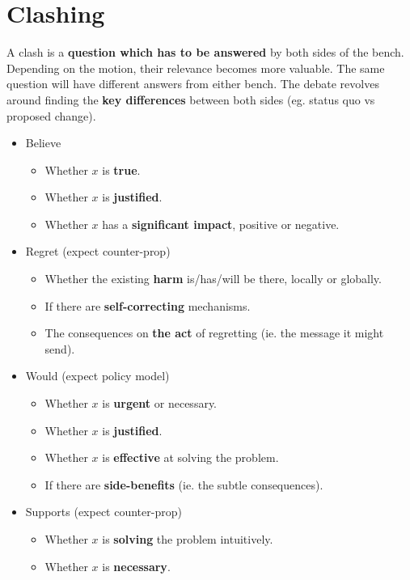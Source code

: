 

\section*{Clashing}

A clash is a \textbf{question which has to be answered} by both sides of the bench. Depending on the motion, their relevance becomes more valuable. The same question will have different answers from either bench. The debate revolves around finding the \textbf{key differences} between both sides (eg. status quo vs proposed change).

\begin{itemize}
	\item Believe
	\begin{itemize}
		\item Whether $x$ is \textbf{true}.
		\item Whether $x$ is \textbf{justified}.
		\item Whether $x$ has a \textbf{significant impact}, positive or negative.
	\end{itemize}
	\item Regret (expect counter-prop)
	\begin{itemize}
		\item Whether the existing \textbf{harm} is/has/will be there, locally or globally.
		\item If there are \textbf{self-correcting} mechanisms.
		\item The consequences on \textbf{the act} of regretting (ie. the message it might send).
	\end{itemize}
	\item Would (expect policy model)
	\begin{itemize}
		\item Whether $x$ is \textbf{urgent} or necessary.
		\item Whether $x$ is \textbf{justified}.
		\item Whether $x$ is \textbf{effective} at solving the problem.
		\item If there are \textbf{side-benefits} (ie. the subtle consequences).
	\end{itemize}
	\item Supports (expect counter-prop)
	\begin{itemize}
		\item Whether $x$ is \textbf{solving} the problem intuitively.
		\item Whether $x$ is \textbf{necessary}.

\end{itemize}
\end{itemize}
